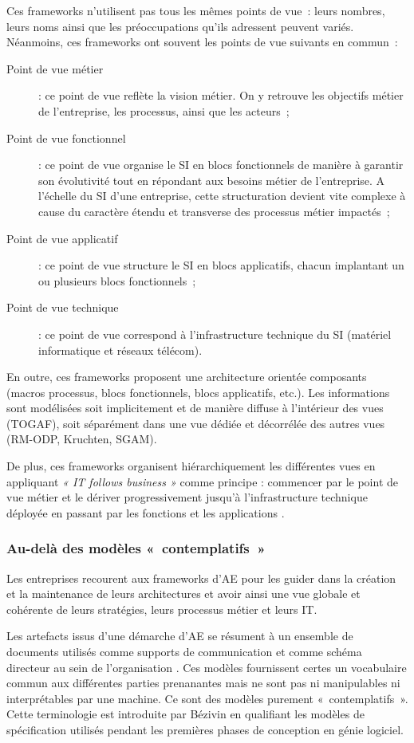 Ces frameworks n'utilisent pas tous les mêmes points de vue~: leurs nombres, leurs noms 
ainsi que les préoccupations qu'ils adressent peuvent variés. Néanmoins, ces 
frameworks ont souvent les points de vue suivants en commun~:
\begin{description}
\item[Point de vue métier]  : ce point de vue reflète la vision métier. On y retrouve les objectifs métier de l'entreprise, les processus, ainsi que les acteurs~;
\item[Point de vue fonctionnel] : ce point de vue organise le SI en blocs fonctionnels de manière à garantir son évolutivité tout en répondant aux besoins métier de l'entreprise. A l'échelle du SI d'une entreprise, cette structuration devient vite complexe à cause du caractère étendu et transverse des processus métier impactés~;
\item[Point de vue applicatif] : ce point de vue structure le SI en blocs applicatifs, chacun implantant un ou plusieurs blocs fonctionnels~;
\item[Point de vue technique] : ce point de vue correspond à l'infrastructure technique du SI (matériel informatique et réseaux télécom).
\end{description}

En outre, ces frameworks proposent une architecture orientée composants (macros processus, blocs fonctionnels, blocs applicatifs, etc.). Les informations sont modélisées soit implicitement et de manière diffuse à l'intérieur des vues (TOGAF), soit séparément dans une vue dédiée et décorrélée des autres vues (RM-ODP, Kruchten, SGAM).

De plus, ces frameworks organisent hiérarchiquement les différentes vues en appliquant \emph{« IT follows business »} comme principe : commencer par le point de vue métier et le dériver progressivement jusqu'à l'infrastructure technique déployée en passant par les fonctions et les applications \cite{winter2006essential}.

\subsubsection{Au-delà des modèles «~contemplatifs~»}

Les entreprises recourent aux frameworks d'AE pour les guider dans la création et la maintenance de leurs architectures et avoir ainsi une vue globale et cohérente de leurs stratégies, leurs processus métier et leurs IT.

Les artefacts issus d'une démarche d'AE se résument à un ensemble de documents utilisés comme supports de communication et comme schéma directeur au sein de l'organisation \cite{kulkarni_modelling_2013} \cite{clark_towards_2014}. Ces modèles fournissent certes un vocabulaire  commun aux différentes parties prenanantes mais ne sont pas ni manipulables ni interprétables par une machine. Ce sont des modèles purement «~contemplatifs~». Cette terminologie est introduite par Bézivin en qualifiant les modèles de spécification utilisés pendant les premières phases de conception en génie logiciel. 

